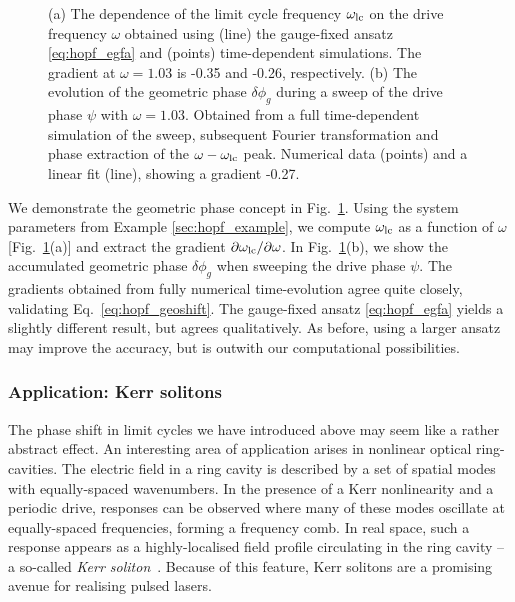 \begin{figure} [h!]
	\centering
	
	\caption{(a) The dependence of the limit cycle frequency $\omega_{\rm lc}$ on the drive frequency $\omega$ obtained using (line) the gauge-fixed ansatz \eqref{eq:hopf_egfa} and (points) time-dependent simulations. The gradient at $\omega=1.03$ is -0.35 and -0.26, respectively. (b) The evolution of the geometric phase $\delta \phi_g$ during a sweep of the drive phase $\psi$ with $\omega=1.03$. Obtained from a full time-dependent simulation of the sweep, subsequent Fourier transformation and phase extraction of the $\omega - \omega_{\rm lc}$ peak. Numerical data (points) and a linear fit (line), showing a gradient -0.27.}
	\label{fig:hopf_lc_phase}
\end{figure}

We demonstrate the geometric phase concept in Fig.~\ref{fig:hopf_lc_phase}. Using the system parameters from Example \ref{sec:hopf_example}, we compute $ \omega_{\rm lc}$ as a function of $\omega$ [Fig.~\ref{fig:hopf_lc_phase}(a)] and extract the gradient $\partial \omega_{\rm lc} / \partial \omega$. In Fig.~\ref{fig:hopf_lc_phase}(b), we show the accumulated geometric phase $\delta \phi_g$ when sweeping the drive phase $\psi$. The gradients obtained from fully numerical time-evolution agree quite closely, validating Eq.~\eqref{eq:hopf_geoshift}. The gauge-fixed ansatz \eqref{eq:hopf_egfa} yields a slightly different result, but agrees qualitatively. As before, using a larger ansatz may improve the accuracy, but is outwith our computational possibilities. 

\subsubsection{Application: Kerr solitons}

The phase shift in limit cycles we have introduced above may seem like a rather abstract effect. An interesting area of application arises in nonlinear optical ring-cavities. The electric field in a ring cavity is described by a set of spatial modes with equally-spaced wavenumbers. In the presence of a Kerr nonlinearity and a periodic drive, responses can be observed where many of these modes oscillate at equally-spaced frequencies, forming a frequency comb. In real space, such a response appears as a highly-localised field profile circulating in the ring cavity -- a so-called \textit{Kerr soliton}~\cite{Weng_2022, Lugiato_2018, Herr_2012}. Because of this feature, Kerr solitons are a promising avenue for realising pulsed lasers. 

